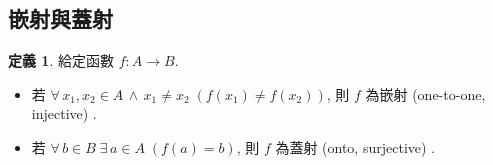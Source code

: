 \documentclass[12pt,a4paper]{extarticle}
\newcommand{\ds}{\displaystyle}
\newcommand{\ie}{\;\Longrightarrow\;}
\DeclareMathOperator*{\dom}{dom}
\DeclareMathOperator*{\ran}{ran}
\theoremstyle{definition}
\newtheorem*{dfn}{定義}
\newtheorem*{ex}{例}
\newtheorem*{sol}{解}
\begin{document}
%
%
%
%
\subsection*{嵌射與蓋射}
\begin{dfn} 給定函數 $f: A\to B$. 
  \begin{itemize}\setlength\itemsep{0em}
    \item 若 $\forall\,x_1, x_2\in A\,\wedge\,x_1\not=x_2\; (f(x_1)\not=f(x_2))$, 則 $f$ 為嵌射 (one-to-one, injective) . 
    \item 若 $\forall\,b\in B\;\exists\,a\in A\;(f(a) = b)$, 則 $f$ 為蓋射 (onto, surjective) . 
  \end{itemize}
\end{dfn}

%
\end{document}
